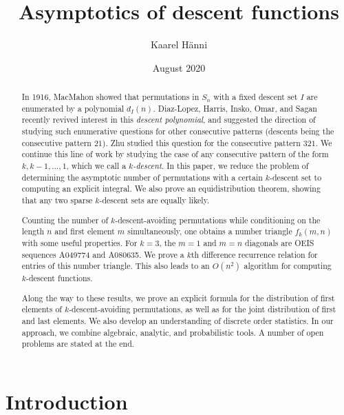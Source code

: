 \documentclass{amsart}
\author{Kaarel H\" anni}
\theoremstyle{definition}
\begin{document}
\title{Asymptotics of descent functions}
\date{August 2020}

\begin{abstract}
In 1916, MacMahon showed that permutations in $S_n$ with a fixed descent set $I$ are enumerated by a polynomial $d_I(n)$. Diaz-Lopez, Harris, Insko, Omar, and Sagan recently revived interest in this \emph{descent polynomial}, and suggested the direction of studying such enumerative questions for other consecutive patterns (descents being the consecutive pattern $21$). Zhu studied this question for the consecutive pattern $321$. We continue this line of work by studying the case of any consecutive pattern of the form $k,k-1,\ldots,1$, which we call a \emph{$k$-descent}. In this paper, we reduce the problem of determining the asymptotic number of permutations with a certain $k$-descent set to computing an explicit integral. We also prove an equidistribution theorem, showing that any two sparse $k$-descent sets are equally likely.

Counting the number of $k$-descent-avoiding permutations while conditioning on the length $n$ and first element $m$ simultaneously, one obtains a number triangle $f_k(m,n)$ with some useful properties. For $k=3$, the $m=1$ and $m=n$ diagonals are OEIS sequences A049774 and A080635. We prove a $k$th difference recurrence relation for entries of this number triangle. This also leads to an $O(n^2)$ algorithm for computing $k$-descent functions. 

Along the way to these results, we prove an explicit formula for the distribution of first elements of $k$-descent-avoiding permutations, as well as for the joint distribution of first and last elements. We also develop an understanding of discrete order statistics. In our approach, we combine algebraic, analytic, and probabilistic tools. A number of open problems are stated at the end.

\end{abstract}

\maketitle

\section{Introduction}

\end{document}

